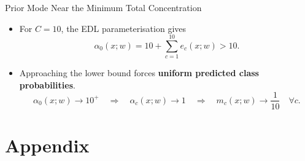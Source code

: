 \begin{frame}{Prior Mode Near the Minimum Total Concentration}
\label{frm:appendix-prior-near-minimum}
\begin{itemize}
\setlength{\itemsep}{4mm}
\item For $C=10$, the EDL parameterisation gives
\[
\alpha_0(x;w)=10+\sum_{c=1}^{10}e_c(x;w)>10.
\]
\item Approaching the lower bound forces \textbf{uniform predicted class probabilities}.
\[
\alpha_0(x;w)\to10^+
\quad\Longrightarrow\quad
\alpha_c(x;w)\to1
\quad\Longrightarrow\quad
m_c(x;w)\to\frac{1}{10}\quad\forall c.
\]
\end{itemize}
\end{frame}



\section*{Appendix}

